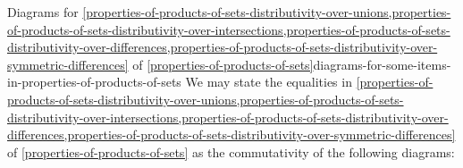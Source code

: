 \begin{remark}{Diagrams for \cref{properties-of-products-of-sets-distributivity-over-unions,properties-of-products-of-sets-distributivity-over-intersections,properties-of-products-of-sets-distributivity-over-differences,properties-of-products-of-sets-distributivity-over-symmetric-differences} of \cref{properties-of-products-of-sets}}{diagrams-for-some-items-in-properties-of-products-of-sets}%
    We may state the equalities in \cref{properties-of-products-of-sets-distributivity-over-unions,properties-of-products-of-sets-distributivity-over-intersections,properties-of-products-of-sets-distributivity-over-differences,properties-of-products-of-sets-distributivity-over-symmetric-differences} of \cref{properties-of-products-of-sets} as the commutativity of the following diagrams:%
    \begin{scalemath}
        \quad

\end{scalemath}
\end{remark}
